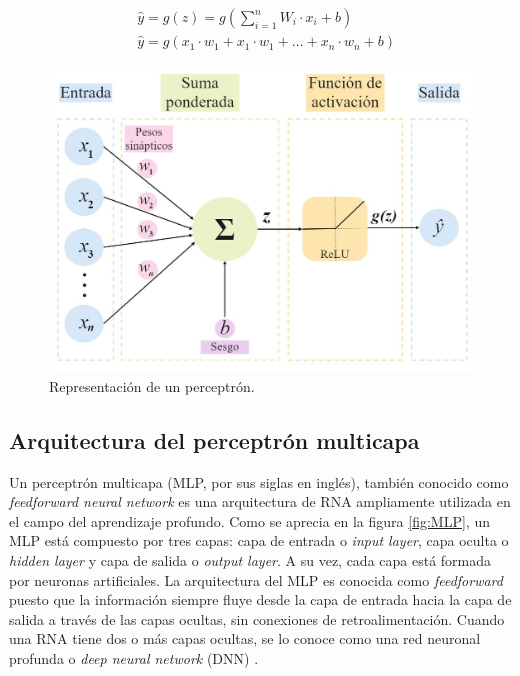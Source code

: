 \begin{equation}\label{eq:perceptron}
\begin{split}
	&\hat{y} = g(z) = g( \sum_{i=1}^{n} W_{i} \cdot x_{i} + b) \\
				&\hat{y} = g(x_1 \cdot w_1 + x_1 \cdot w_1 + … + x_n \cdot w_n + b)
\end{split}
\end{equation}

\begin{figure}[h!]
	\centering
	\includegraphics[width=\textwidth]{./Figures/Perceptron.jpg}
	\caption{Representación de un perceptrón\protect\footnotemark.}
	\label{fig:Perceptron}
\end{figure}



\subsection{Arquitectura del perceptrón multicapa}

Un perceptrón multicapa (MLP, por sus siglas en inglés), también conocido como \emph{feedforward neural network} es 
una arquitectura de RNA ampliamente utilizada en el campo del aprendizaje profundo. Como se aprecia en la figura \ref{fig:MLP}, 
un MLP está compuesto por tres capas: capa de entrada o \emph{input layer}, capa oculta 
o \emph{hidden layer} y capa de salida o \emph{output layer}. 
A su vez, cada capa está formada por neuronas artificiales. La arquitectura del MLP es conocida como \emph{feedforward} 
puesto que la información siempre fluye desde la capa de entrada hacia la capa de salida a través de las capas ocultas, 
sin conexiones de retroalimentación. Cuando una RNA tiene dos o más capas ocultas, se lo conoce como una red neuronal 
profunda o \emph{deep neural network} (DNN) \citep{CITE:35} \citep{CITE:44}. 

